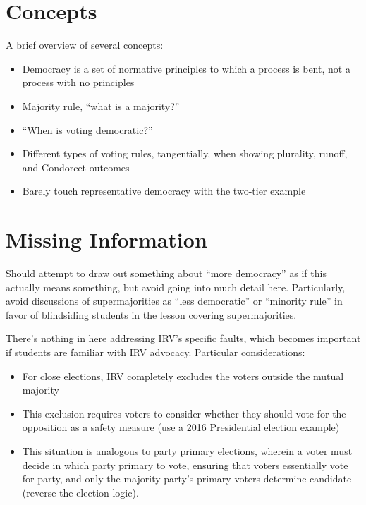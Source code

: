 \section{Concepts}

A brief overview of several concepts:

\begin{itemize}
    \item Democracy is a set of normative principles to which a process is bent, not a process with no principles

    \item Majority rule, ``what is a majority?''

    \item ``When is voting democratic?''

    \item Different types of voting rules, tangentially, when showing plurality, runoff, and Condorcet outcomes

    \item Barely touch representative democracy with the two-tier example
\end{itemize}

\section{Missing Information}

Should attempt to draw out something about ``more democracy'' as if this actually means something, but avoid going into much detail here.  Particularly, avoid discussions of supermajorities as ``less democratic'' or ``minority rule'' in favor of blindsiding students in the lesson covering supermajorities.

There's nothing in here addressing IRV's specific faults, which becomes important if students are familiar with IRV advocacy.  Particular considerations:

\begin{itemize}
    \item For close elections, IRV completely excludes the voters outside the mutual majority

    \item This exclusion requires voters to consider whether they should vote for the opposition as a safety measure (use a 2016 Presidential election example)

    \item This situation is analogous to party primary elections, wherein a voter must decide in which party primary to vote, ensuring that voters essentially vote for party, and only the majority party's primary voters determine candidate (reverse the election logic).
\end{itemize}